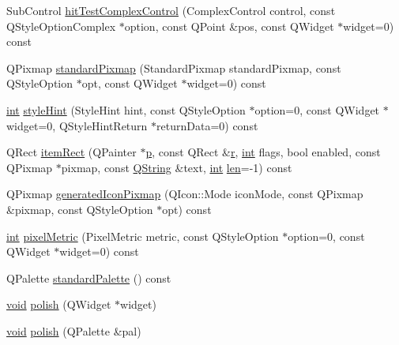 \begin{DoxyCompactItemize}
\item 
Sub\-Control \hyperlink{group___core_plugin_ga1dce79a28fc44a61d53baca24aaa4754}{hit\-Test\-Complex\-Control} (Complex\-Control control, const Q\-Style\-Option\-Complex $\ast$option, const Q\-Point \&pos, const Q\-Widget $\ast$widget=0) const 
\item 
Q\-Pixmap \hyperlink{group___core_plugin_ga175a432cafb816b4ac5f32966bc8acd3}{standard\-Pixmap} (Standard\-Pixmap standard\-Pixmap, const Q\-Style\-Option $\ast$opt, const Q\-Widget $\ast$widget=0) const 
\item 
\hyperlink{ioapi_8h_a787fa3cf048117ba7123753c1e74fcd6}{int} \hyperlink{group___core_plugin_ga52818c2da80eda9a0961a672d7d0f9d7}{style\-Hint} (Style\-Hint hint, const Q\-Style\-Option $\ast$option=0, const Q\-Widget $\ast$widget=0, Q\-Style\-Hint\-Return $\ast$return\-Data=0) const 
\item 
Q\-Rect \hyperlink{group___core_plugin_gaf4019d968fe156c4b16f8b3216544a0e}{item\-Rect} (Q\-Painter $\ast$\hyperlink{glext_8h_aa5367c14d90f462230c2611b81b41d23}{p}, const Q\-Rect \&\hyperlink{glext_8h_abe08814c2f72843fde4d8df41440d5a0}{r}, \hyperlink{ioapi_8h_a787fa3cf048117ba7123753c1e74fcd6}{int} flags, bool enabled, const Q\-Pixmap $\ast$pixmap, const \hyperlink{group___u_a_v_objects_plugin_gab9d252f49c333c94a72f97ce3105a32d}{Q\-String} \&text, \hyperlink{ioapi_8h_a787fa3cf048117ba7123753c1e74fcd6}{int} \hyperlink{glext_8h_ac759c9f8b2506530e65879e566e59f02}{len}=-\/1) const 
\item 
Q\-Pixmap \hyperlink{group___core_plugin_gafda287aff563c7ed26a8301096c93fe2}{generated\-Icon\-Pixmap} (Q\-Icon\-::\-Mode icon\-Mode, const Q\-Pixmap \&pixmap, const Q\-Style\-Option $\ast$opt) const 
\item 
\hyperlink{ioapi_8h_a787fa3cf048117ba7123753c1e74fcd6}{int} \hyperlink{group___core_plugin_gab82e6e47c29f4a4dc06d1fc447c7f9f0}{pixel\-Metric} (Pixel\-Metric metric, const Q\-Style\-Option $\ast$option=0, const Q\-Widget $\ast$widget=0) const 
\item 
Q\-Palette \hyperlink{group___core_plugin_ga9045a941a0161ceafde31250e553909c}{standard\-Palette} () const 
\item 
\hyperlink{group___u_a_v_objects_plugin_ga444cf2ff3f0ecbe028adce838d373f5c}{void} \hyperlink{group___core_plugin_ga69c435e6556d68ccfbdbd2226c913510}{polish} (Q\-Widget $\ast$widget)
\item 
\hyperlink{group___u_a_v_objects_plugin_ga444cf2ff3f0ecbe028adce838d373f5c}{void} \hyperlink{group___core_plugin_ga4ba18ac82b5981cd705a2db4abc674ee}{polish} (Q\-Palette \&pal)

\end{DoxyCompactItemize}
